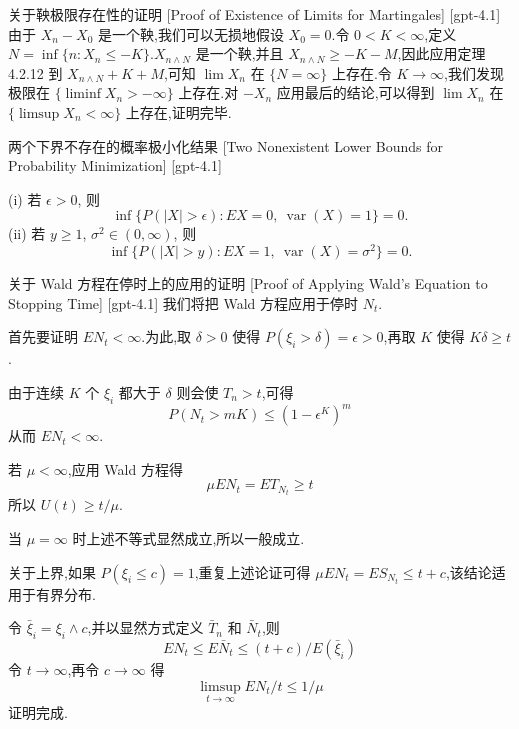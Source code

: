 \documentclass[UTF8]{ctexart}
\begin{document}
    
    
    \begin{prf}
        {关于鞅极限存在性的证明}
        [Proof of Existence of Limits for Martingales]
        [gpt-4.1]
        由于 $X_{n} - X_{0}$ 是一个鞅,我们可以无损地假设 $X_{0} = 0$.令 $0 < K < \infty$,定义 $N = \inf\{ n : X_{n} \leq -K \}$.$X_{n \wedge N}$ 是一个鞅,并且 $X_{n \wedge N} \geq -K - M$,因此应用定理 4.2.12 到 $X_{n \wedge N} + K + M$,可知 $\lim X_{n}$ 在 $\{ N = \infty \}$ 上存在.令 $K \to \infty$,我们发现极限在 $\{ \liminf X_{n} > -\infty \}$ 上存在.对 $-X_{n}$ 应用最后的结论,可以得到 $\lim X_{n}$ 在 $\{ \limsup X_{n} < \infty \}$ 上存在,证明完毕.
    \end{prf}
    
    
    
    \begin{thm}
        {两个下界不存在的概率极小化结果}
        [Two Nonexistent Lower Bounds for Probability Minimization]
        [gpt-4.1]
        
(i) 若 $\epsilon > 0$, 则
\[
\inf\{P(|X| > \epsilon) : E X = 0,~\operatorname{var}(X) = 1\} = 0.
\]
(ii) 若 $y \ge 1$, $\sigma^2 \in (0, \infty)$, 则
\[
\inf\{P(|X| > y) : E X = 1,~\operatorname{var}(X) = \sigma^2\} = 0.
\]

    \end{thm}
    
    
    
    \begin{prf}
        {关于 Wald 方程在停时上的应用的证明}
        [Proof of Applying Wald's Equation to Stopping Time]
        [gpt-4.1]
        我们将把 Wald 方程应用于停时 $N_t$.

首先要证明 $E N_t < \infty$.为此,取 $\delta > 0$ 使得 $P(\xi_i > \delta) = \epsilon > 0$,再取 $K$ 使得 $K \delta \ge t$.

由于连续 $K$ 个 $\xi_i$ 都大于 $\delta$ 则会使 $T_n > t$,可得
\[
P(N_t > mK) \leq (1 - \epsilon^K)^m
\]
从而 $E N_t < \infty$.

若 $\mu < \infty$,应用 Wald 方程得
\[
\mu E N_t = E T_{N_t} \geq t
\]
所以 $U(t) \geq t / \mu$.

当 $\mu = \infty$ 时上述不等式显然成立,所以一般成立.

关于上界,如果 $P(\xi_i \le c) = 1$,重复上述论证可得 $\mu E N_t = E S_{N_t} \leq t + c$,该结论适用于有界分布.

令 $\bar{\xi}_i = \xi_i \wedge c$,并以显然方式定义 $\bar{T}_n$ 和 $\bar{N}_t$,则
\[
E N_t \leq E \bar{N}_t \leq (t + c) / E(\bar{\xi}_i)
\]
令 $t \to \infty$,再令 $c \to \infty$ 得
\[
\limsup_{t \to \infty} E N_t / t \leq 1 / \mu
\]
证明完成.

    \end{prf}
    
\end{document}
